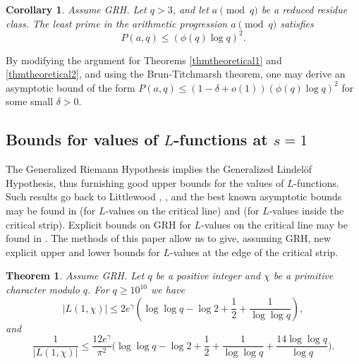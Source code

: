 \documentclass [12pt]{amsart}
\newtheorem{thm}{Theorem}[section]
\newtheorem{corol}{Corollary}[section]
\numberwithin{equation}{section}
\begin{document}
\begin{corol}\label{thmexplicit2}
Assume GRH. Let $q>3$, and let $a\pmod q$ be a reduced residue class.  
The least prime in the arithmetic progression $a\pmod q$ satisfies 
$$
P(a,q)\leq (\phi(q)\log q)^2.
$$
\end{corol}
 
By modifying the argument for Theorems \ref{thmtheoretical1} and \ref{thmtheoretical2}, 
and using the Brun-Titchmarsh theorem, one may derive an asymptotic 
bound of the form $P(a,q) \le (1-\delta+o(1)) (\phi(q)\log q)^2$ for 
some small $\delta >0$.  
 
 

\subsection{Bounds for values of $L$-functions at $s=1$}

The Generalized Riemann Hypothesis implies the Generalized Lindel{\" o}f Hypothesis, 
thus furnishing good upper bounds for the values of $L$-functions.  Such 
results go back to Littlewood \cite{Li1}, \cite{Li2}, and the best known asymptotic bounds 
may be found in \cite{ChSo} (for $L$-values on the critical line) and \cite{CaCh} 
(for $L$-values inside the critical strip).  Explicit bounds on GRH  for $L$-values on the critical 
line may be found in \cite{Ch}.    The methods of this paper allow us to 
give, assuming GRH, new explicit upper and lower bounds for $L$-values at the 
edge of the critical strip.  

\begin{thm}\label{L1chi}
Assume GRH. Let $q$ be a positive integer and $\chi$ be a primitive character modulo $q$.  For 
$q \ge 10^{10}$ we have
$$
|L(1,\chi)|\leq 2e^{\gamma}\left(\log\log q-\log 2+\frac{1}{2}+ \frac{1}{\log\log q}\right),
$$
and
$$\frac{1}{|L(1,\chi)|}\leq \frac{12e^{\gamma}}{\pi^2} \Big( \log \log q -\log 2 +\frac 12 + \frac{1}{\log \log q}+\frac{14\log\log q}{\log q}\Big).$$
\end{thm}

\end{document}
